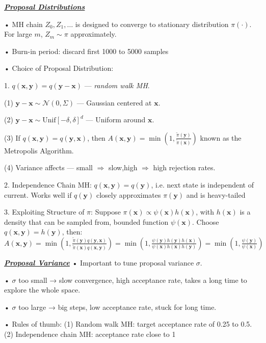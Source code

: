 \documentclass[10pt]{article}
\newcommand{\bulletPoint}[1]{\ul{\textit{\textbf{#1}}}}
\begin{document}
\begin{multicols*}{3}
\bulletPoint{Proposal Distributions}\quad

• MH chain $Z_0, Z_1, \dots$ is designed to converge to stationary distribution $\pi(\cdot)$.   
For large $m$, $Z_m \sim \pi$ approximately.   

• Burn-in period: discard first 1000 to 5000 samples

• Choice of Proposal Distribution:

1. $q(\mathbf{x}, \mathbf{y}) = q(\mathbf{y} - \mathbf{x})$ — \textit{random walk MH}.   

(1) $\mathbf{y} - \mathbf{x} \sim \mathcal{N}(0, \Sigma)$ — Gaussian centered at $\mathbf{x}$. \quad  

(2) $\mathbf{y} - \mathbf{x} \sim \text{Unif}[-\delta, \delta]^d$ — Uniform around $\mathbf{x}$.   \quad

(3) If $q(\mathbf{x}, \mathbf{y}) = q(\mathbf{y}, \mathbf{x})$, then  
$A(\mathbf{x}, \mathbf{y}) = \min\left(1, \frac{\tilde{\pi}(\mathbf{y})}{\tilde{\pi}(\mathbf{x})}\right)$  known as the Metropolis Algorithm. 

(4) Variance affects — small $\Rightarrow$ slow,\quad high $\Rightarrow$ high rejection rates.

2. Independence Chain MH: 
$q(\mathbf{x}, \mathbf{y}) = q(\mathbf{y})$, i.e. next state is independent of current. \quad  
Works well if $q(\mathbf{y})$ closely approximates $\pi(\mathbf{y})$ and is heavy-tailed

3. Exploiting Structure of $\pi$: 
Suppose $\pi(\mathbf{x}) \propto \psi(\mathbf{x}) h(\mathbf{x})$, with $h(\mathbf{x})$ is a density
that can be sampled from, bounded function $\psi(\mathbf{x})$. \quad  
Choose $q(\mathbf{x}, \mathbf{y}) = h(\mathbf{y})$, then:
$A(\mathbf{x}, \mathbf{y}) = \min\left(1, \frac{\tilde{\pi}(\mathbf{y})q(\mathbf{y}, \mathbf{x})}{\tilde{\pi}(\mathbf{x})q(\mathbf{x}, \mathbf{y})} \right)
= \min\left(1, \frac{\psi(\mathbf{y})h(\mathbf{y})h(\mathbf{x})}{\psi(\mathbf{x})h(\mathbf{x})h(\mathbf{y})} \right)
= \min\left(1, \frac{\psi(\mathbf{y})}{\psi(\mathbf{x})} \right)$


\bulletPoint{Proposal Variance} \quad
• Important to tune proposal variance $\sigma$. \quad

• $\sigma$ too small → slow convergence, high acceptance rate, takes a long time to explore the whole space. 

• $\sigma$ too large → big steps, low acceptance rate, stuck for long time. 

• Rules of thumb:
(1) Random walk MH: target acceptance rate of 0.25 to 0.5. 
(2) Independence chain MH: acceptance rate close to 1


\end{multicols*}
\end{document}
